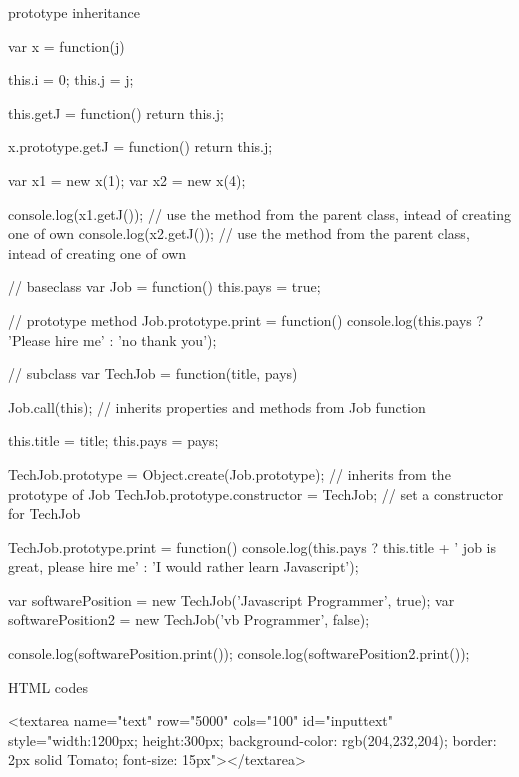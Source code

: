 \documentclass[a4paper,12pt]{article}
\begin{document}
\begin{description}
\item prototype inheritance
\begin{jscode}
var x = function(j){
	this.i = 0;
	this.j = j;

	this.getJ = function(){
		return this.j;
	}
}

x.prototype.getJ = function(){
	return this.j;
}

var x1 = new x(1);
var x2 = new x(4);

console.log(x1.getJ()); // use the method from the parent class, intead of creating one of own
console.log(x2.getJ()); // use the method from the parent class, intead of creating one of own
\end{jscode}

\begin{jscode}
// baseclass
var Job = function(){
	this.pays = true;
}

// prototype method
Job.prototype.print = function(){
	console.log(this.pays ? 'Please hire me' : 'no thank you');
}

// subclass
var TechJob = function(title, pays){
	Job.call(this); // inherits properties and methods from Job function

	this.title = title;
	this.pays = pays;
}

TechJob.prototype = Object.create(Job.prototype); // inherits from the prototype of Job
TechJob.prototype.constructor = TechJob; // set a constructor for TechJob

TechJob.prototype.print = function(){
	console.log(this.pays ? this.title + ' job is great, please hire me' : 'I would rather learn Javascript');
}

var softwarePosition = new TechJob('Javascript Programmer', true);
var softwarePosition2 = new TechJob('vb Programmer', false);

console.log(softwarePosition.print());
console.log(softwarePosition2.print());
\end{jscode}

\item HTML codes
\begin{htmlcode}
<textarea name="text" row="5000" cols="100" id="inputtext" style="width:1200px; height:300px; background-color: rgb(204,232,204); border: 2px solid Tomato; font-size: 15px"></textarea>
\end{htmlcode}

\end{description}







\end{document}
